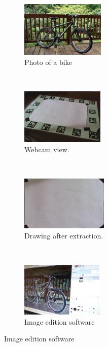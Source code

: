 \documentclass{article}
\begin{document}
\begin{figure}[!htb]
        \begin{subfigure}[b]{0.20\textwidth}
                \centering
                \includegraphics[height= 2.65cm]{DSC00024-s}
                \caption{Photo of a bike}
                \label{fig:bike}
        \end{subfigure}%
        ~ \hspace{4mm}
        \begin{subfigure}[b]{0.20\textwidth}
                \centering
                \includegraphics[height= 2.65cm]{cam}
                \caption{Webcam view.}
                \label{fig:webcam}
        \end{subfigure}
        \\
        \begin{subfigure}[b]{0.20\textwidth}
                \centering
                \includegraphics[height= 2.6cm]{extract}
                \caption{Drawing after extraction.}
                \label{fig:extract}
        \end{subfigure}
        ~ \hspace{4mm}
        \begin{subfigure}[b]{0.20\textwidth}
                \centering
                \includegraphics[height= 2.6cm]{DSC00286}
                \caption{Image edition software}

\end{subfigure}
\end{figure}
\end{document}

